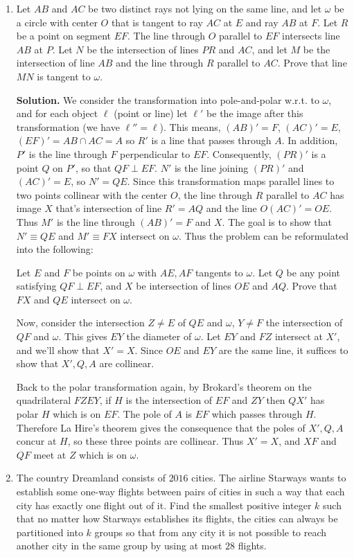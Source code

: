 \documentclass[11pt,a4paper]{article}
\begin{document}
\begin{enumerate}
	\item Let $AB$ and $AC$ be two distinct rays not lying on the same line, and let $\omega$ be a circle with center $O$ that is tangent to ray $AC$ at $E$ and ray $AB$ at $F$. Let $R$ be a point on segment $EF$. The line through $O$ parallel to $EF$ intersects line $AB$ at $P$. Let $N$ be the intersection of lines $PR$ and $AC$, and let $M$ be the intersection of line $AB$ and the line through $R$ parallel to $AC$. Prove that line $MN$ is tangent to $\omega$.
	
	\textbf{Solution.} We consider the transformation into pole-and-polar w.r.t. to $\omega$, and for each object $\ell$ (point or line) let $\ell'$ be the image after this transformation (we have $\ell''=\ell$). This means, $(AB)'=F$, $(AC)'=E$, $(EF)'=AB\cap AC=A$ so $R'$ is a line that passes through $A$. 
	In addition, $P'$ is the line through $F$ perpendicular to $EF$. Consequently, $(PR)'$ is a point $Q$ on $P'$, so that $QF\perp EF$. 
	$N'$ is the line joining $(PR)'$ and $(AC)'=E$, so $N'=QE$. 
	Since this transformation maps parallel lines to two points collinear with the center $O$, the line through $R$ parallel to $AC$ has image $X$ that's intersection of line $R'=AQ$ and the line $O(AC)'=OE$. Thus $M'$ is the line through $(AB)'=F$ and $X$. 
	The goal is to show that $N'\equiv QE$ and $M'\equiv FX$ intersect on $\omega$. Thus the problem can be reformulated into the following: 
	
	Let $E$ and $F$ be points on $\omega$ with $AE, AF$ tangents to $\omega$. 
	Let $Q$ be any point satisfying $QF\perp EF$, and $X$ be intersection of lines $OE$ and $AQ$. Prove that $FX$ and $QE$ intersect on $\omega$. 
	
	Now, consider the intersection $Z\neq E$ of $QE$ and $\omega$, $Y\neq F$ the intersection of $QF$ and $\omega$. This gives $EY$ the diameter of $\omega$. Let $EY$ and $FZ$ intersect at $X'$, and we'll show that $X'=X$. Since $OE$ and $EY$ are the same line, it suffices to show that $X', Q, A$ are collinear. 
	
	Back to the polar transformation again, by Brokard's theorem on the quadrilateral $FZEY$, if $H$ is the intersection of $EF$ and $ZY$ then $QX'$ has polar $H$ which is on $EF$. The pole of $A$ is $EF$ which passes through $H$. Therefore La Hire's theorem gives the consequence that the poles of $X', Q, A$ concur at $H$, so these three points are collinear. Thus $X'=X$, and $XF$ and $QF$ meet at $Z$ which is on $\omega$. 
	
	
	\item The country Dreamland consists of $2016$ cities. The airline Starways wants to establish some one-way flights between pairs of cities in such a way that each city has exactly one flight out of it. Find the smallest positive integer $k$ such that no matter how Starways establishes its flights, the cities can always be partitioned into $k$ groups so that from any city it is not possible to reach another city in the same group by using at most $28$ flights.
	

\end{enumerate}
\end{document}
